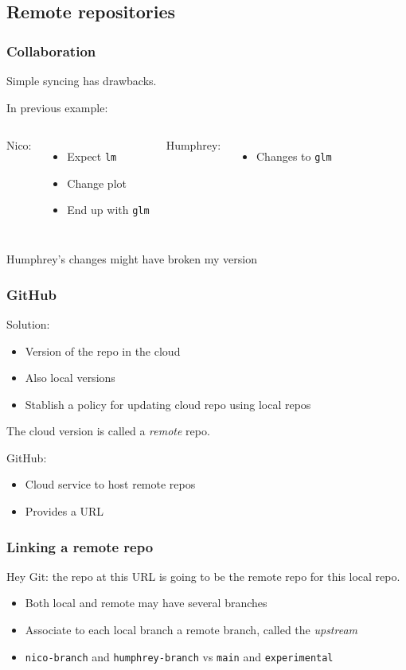 \documentclass{beamer}
\begin{document}
\subsection{Remote repositories}

\begin{frame}[fragile]
    \frametitle{Collaboration}
    Simple syncing has drawbacks.

    In previous example:
    \begin{columns}
        Nico: 
        \begin{itemize}
            \item Expect \verb|lm|
            \item Change plot
            \item End up with \verb|glm|
        \end{itemize}
        Humphrey:
        \begin{itemize}
            \item Changes to \verb|glm|
        \end{itemize}
    \end{columns}
    
    Humphrey's changes might have broken my version
\end{frame}

\begin{frame}
    \frametitle{GitHub}
    Solution:
    \begin{itemize}
        \item Version of the repo in the cloud
        \item Also local versions
        \item Stablish a policy for updating cloud repo using local repos
    \end{itemize}

    The cloud version is called a \textit{remote} repo. 

    GitHub: 
    \begin{itemize}
        \item Cloud service to host remote repos
        \item Provides a URL
    \end{itemize}
\end{frame}

\begin{frame}[fragile]
    \frametitle{Linking a remote repo}
    Hey Git: the repo at this URL is going to be the remote repo for this local repo.
    \begin{itemize}
        \item Both local and remote may have several branches
        \item Associate to each local branch a remote branch, called the \textit{upstream}
        \item \verb|nico-branch| and \verb|humphrey-branch| vs \verb|main| and \verb|experimental|
    \end{itemize}
\end{frame}
        
\end{document}
